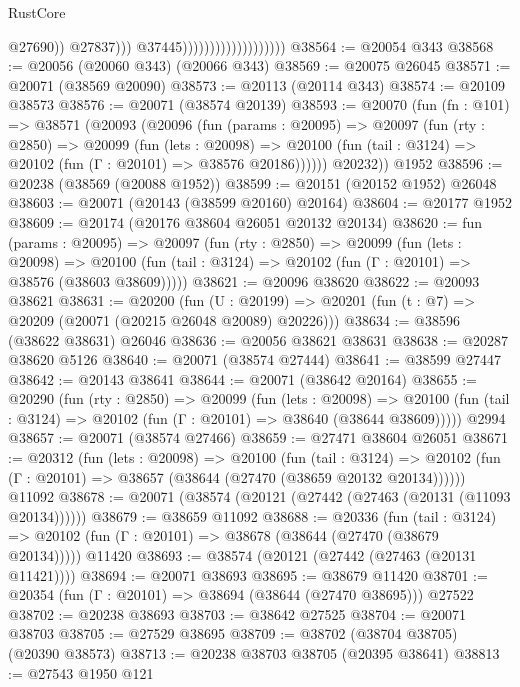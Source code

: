 \begin{lexlean}{RustCore}
\begin{coremodule}
                                                    @27690))
                                                @27837)))
                                          @37445)))))))))))))))))))
@38564 := @20054 @343
@38568 := @20056 (@20060 @343) (@20066 @343)
@38569 := @20075 @26045
@38571 := @20071 (@38569 @20090)
@38573 := @20113 (@20114 @343)
@38574 := @20109 @38573
@38576 := @20071 (@38574 @20139)
@38593 := @20070
    (fun (fn : @101) =>
    @38571
      (@20093
        (@20096
          (fun (params : @20095) =>
          @20097
            (fun (rty : @2850) =>
            @20099
              (fun (lets : @20098) =>
              @20100 (fun (tail : @3124) => @20102 (fun (Γ : @20101) => @38576 @20186))))))
        @20232))
    @1952
@38596 := @20238 (@38569 (@20088 @1952))
@38599 := @20151 (@20152 @1952) @26048
@38603 := @20071 (@20143 (@38599 @20160) @20164)
@38604 := @20177 @1952
@38609 := @20174 (@20176 @38604 @26051 @20132 @20134)
@38620 := fun (params : @20095) =>
  @20097
    (fun (rty : @2850) =>
    @20099
      (fun (lets : @20098) =>
      @20100 (fun (tail : @3124) => @20102 (fun (Γ : @20101) => @38576 (@38603 @38609)))))
@38621 := @20096 @38620
@38622 := @20093 @38621
@38631 := @20200
    (fun (U : @20199) => @20201 (fun (t : @7) => @20209 (@20071 (@20215 @26048 @20089) @20226)))
@38634 := @38596 (@38622 @38631) @26046
@38636 := @20056 @38621 @38631
@38638 := @20287 @38620 @5126
@38640 := @20071 (@38574 @27444)
@38641 := @38599 @27447
@38642 := @20143 @38641
@38644 := @20071 (@38642 @20164)
@38655 := @20290
    (fun (rty : @2850) =>
    @20099
      (fun (lets : @20098) =>
      @20100 (fun (tail : @3124) => @20102 (fun (Γ : @20101) => @38640 (@38644 @38609)))))
    @2994
@38657 := @20071 (@38574 @27466)
@38659 := @27471 @38604 @26051
@38671 := @20312
    (fun (lets : @20098) =>
    @20100
      (fun (tail : @3124) =>
      @20102 (fun (Γ : @20101) => @38657 (@38644 (@27470 (@38659 @20132 @20134))))))
    @11092
@38678 := @20071 (@38574 (@20121 (@27442 (@27463 (@20131 (@11093 @20134))))))
@38679 := @38659 @11092
@38688 := @20336
    (fun (tail : @3124) => @20102 (fun (Γ : @20101) => @38678 (@38644 (@27470 (@38679 @20134)))))
    @11420
@38693 := @38574 (@20121 (@27442 (@27463 (@20131 @11421))))
@38694 := @20071 @38693
@38695 := @38679 @11420
@38701 := @20354 (fun (Γ : @20101) => @38694 (@38644 (@27470 @38695))) @27522
@38702 := @20238 @38693
@38703 := @38642 @27525
@38704 := @20071 @38703
@38705 := @27529 @38695
@38709 := @38702 (@38704 @38705) (@20390 @38573)
@38713 := @20238 @38703 @38705 (@20395 @38641)
@38813 := @27543
    @1950
    @121

\end{coremodule}
\end{lexlean}
